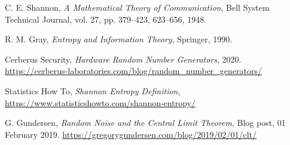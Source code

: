 \newpage
\begin{thebibliography}{99}  
    \raggedright

C. E. Shannon,
\textit{A Mathematical Theory of Communication},
Bell System Technical Journal,
vol. 27, pp. 379--423, 623--656, 1948.

R. M. Gray,
\textit{Entropy and Information Theory},
Springer, 1990.

Cerberus Security,
\textit{Hardware Random Number Generators},
2020.
\url{https://cerberus-laboratories.com/blog/random_number_generators/}

Statistics How To,
\textit{Shannon Entropy Definition},
\url{https://www.statisticshowto.com/shannon-entropy/}

G. Gundersen,
\textit{Random Noise and the Central Limit Theorem},
Blog post, 01 February 2019.
\url{https://gregorygundersen.com/blog/2019/02/01/clt/}

\end{thebibliography}



